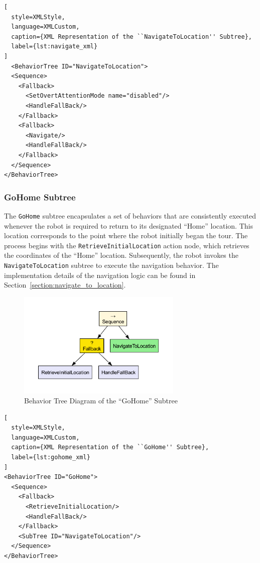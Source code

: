 \documentclass{CSSRforAfrica}
\begin{document}
\bigskip
\bigskip

\begin{lstlisting}[
  style=XMLStyle, 
  language=XMLCustom, 
  caption={XML Representation of the ``NavigateToLocation'' Subtree},
  label={lst:navigate_xml}
]
  <BehaviorTree ID="NavigateToLocation">
  <Sequence>
    <Fallback>
      <SetOvertAttentionMode name="disabled"/>
      <HandleFallBack/>
    </Fallback>
    <Fallback>
      <Navigate/>
      <HandleFallBack/>
    </Fallback>
  </Sequence>
</BehaviorTree>
\end{lstlisting}

\subsubsection{GoHome Subtree}
 
The \texttt{GoHome} subtree encapsulates a set of behaviors that are consistently executed whenever the robot is required to return to its designated ``Home'' location. This location corresponds to the point where the robot initially began the tour. The process begins with the \texttt{RetrieveInitialLocation} action node, which retrieves the coordinates of the ``Home'' location. Subsequently, the robot invokes the \texttt{NavigateToLocation} subtree to execute the navigation behavior. The implementation details of the navigation logic can be found in Section~\ref{section:navigate_to_location}.

\begin{figure}[H]
  \centering
  \includegraphics[width=0.7\textwidth]{./diagrams/gohome.pdf}
  \caption{Behavior Tree Diagram of the ``GoHome'' Subtree}
  \label{fig:gohome_diagram}
\end{figure}
\begin{lstlisting}[
  style=XMLStyle, 
  language=XMLCustom, 
  caption={XML Representation of the ``GoHome'' Subtree},
  label={lst:gohome_xml}
]
<BehaviorTree ID="GoHome">
  <Sequence>
    <Fallback>
      <RetrieveInitialLocation/>
      <HandleFallBack/>
    </Fallback>
    <SubTree ID="NavigateToLocation"/>
  </Sequence>
</BehaviorTree>

\end{lstlisting}
\end{document}
